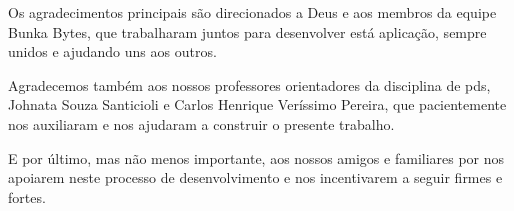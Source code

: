 \begin{agradecimentos}

Os agradecimentos principais são direcionados a Deus e aos membros da equipe Bunka Bytes, que trabalharam juntos para desenvolver está aplicação, sempre unidos e ajudando uns aos outros. 

Agradecemos também aos nossos professores orientadores da disciplina de \acs{pds}, Johnata Souza Santicioli e Carlos Henrique Veríssimo Pereira, que pacientemente nos auxiliaram e nos ajudaram a construir o presente trabalho.

E por último, mas não menos importante, aos nossos amigos e familiares por nos apoiarem neste processo de desenvolvimento e nos incentivarem a seguir firmes e fortes. 

\end{agradecimentos}
